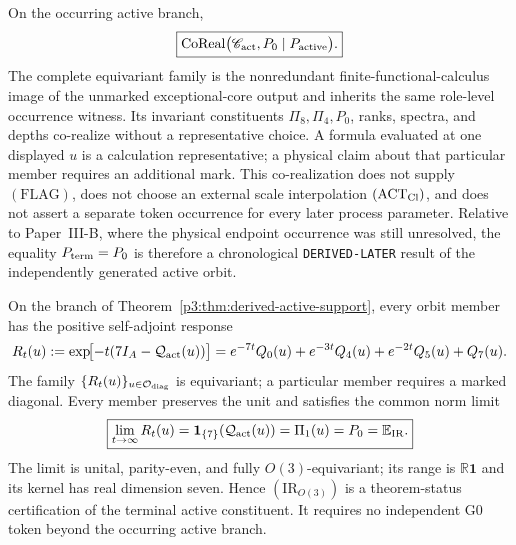 \documentclass[12pt,a4paper]{article}
\begin{document}
\begin{corollary}
\label{p3c:cor:active-projector-corealization}
On the occurring active branch,
\[
 \boxed{
 \operatorname{CoReal}
 \bigl(\mathscr C_{\rm act},P_0\mid P_{\rm active}\bigr).}
\]
The complete equivariant family is the nonredundant finite-functional-calculus
image of the unmarked exceptional-core output and inherits the same role-level
occurrence witness.  Its invariant constituents \(\Pi_8,\Pi_4,P_0\), ranks,
spectra, and depths co-realize without a representative choice.  A formula
evaluated at one displayed \(u\) is a calculation representative; a physical
claim about that particular member requires an additional mark.  This
co-realization does not supply \((\mathrm{FLAG})\), does not choose an
external scale interpolation \((\mathrm{ACT}_{\rm Cl})\), and does not assert
a separate token occurrence for every later process parameter.
Relative to Paper~III-B, where the physical endpoint occurrence was still
unresolved, the equality \(P_{\rm term}=P_0\) is therefore a chronological
\texttt{DERIVED-LATER} result of the independently generated active orbit.
\end{corollary}

\begin{corollary}
\label{p3:cor:derived-infrared-projector}
On the branch of Theorem~\ref{p3:thm:derived-active-support}, every orbit
member has the positive self-adjoint response
\begin{equation}
\label{p3:eq:active-infrared-semigroup}
 R_t(u):=\exp\!\bigl[-t(7I_A-\mathcal Q_{\rm act}(u))\bigr]
 =e^{-7t}Q_0(u)+e^{-3t}Q_4(u)+e^{-2t}Q_5(u)+Q_7(u).
\end{equation}
The family \(\{R_t(u)\}_{u\in\mathcal O_{\rm diag}}\) is equivariant; a
particular member requires a marked diagonal.  Every member preserves the unit
and satisfies the common norm limit
\begin{equation}
\label{p3:eq:active-infrared-limit}
 \boxed{\lim_{t\to\infty}R_t(u)
 =\mathbf1_{\{7\}}(\mathcal Q_{\rm act}(u))
 =\Pi_1(u)=P_0
 =\mathbb E_{\rm IR}.}
\end{equation}
The limit is unital, parity-even, and fully \(O(3)\)-equivariant; its range
is \(\mathbb R\mathbf1\) and its kernel has real dimension seven.  Hence
\((\mathrm{IR}_{O(3)})\) is a theorem-status certification of the terminal
active constituent.  It requires no independent G0 token beyond the occurring
active branch.
\end{corollary}
\end{document}

